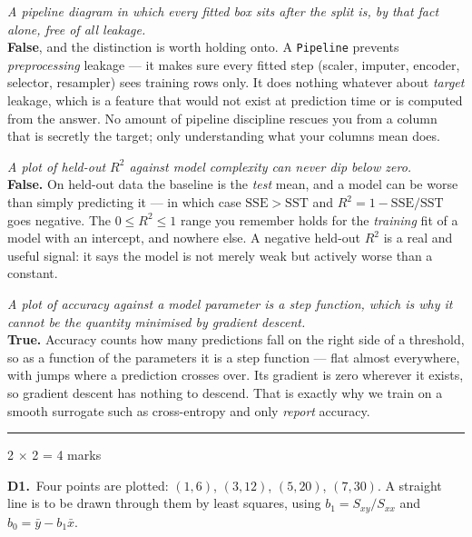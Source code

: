 \documentclass[10pt,a4paper]{article}
\newcommand{\parthead}[2]{\vspace{2pt}\noindent\rule{\linewidth}{0.4pt}\par\vspace{2pt}%
  \noindent{\bfseries Part #1}\hfill{\small #2}\par\vspace{1pt}}
\begin{document}
\begin{sC}

  \item \emph{A pipeline diagram in which every fitted box sits after the split is, by that fact alone, free of all leakage.}\\[2pt] \textbf{False}, and the distinction is worth holding onto. A \texttt{Pipeline} prevents \emph{preprocessing} leakage --- it makes sure every fitted step (scaler, imputer, encoder, selector, resampler) sees training rows only. It does nothing whatever about \emph{target} leakage, which is a feature that would not exist at prediction time or is computed from the answer. No amount of pipeline discipline rescues you from a column that is secretly the target; only understanding what your columns mean does.

  \item \emph{A plot of held-out $R^2$ against model complexity can never dip below zero.}\\[2pt] \textbf{False.} On held-out data the baseline is the \emph{test} mean, and a model can be worse than simply predicting it --- in which case $\mathrm{SSE} > \mathrm{SST}$ and $R^2 = 1 - \mathrm{SSE}/\mathrm{SST}$ goes negative. The $0 \le R^2 \le 1$ range you remember holds for the \emph{training} fit of a model with an intercept, and nowhere else. A negative held-out $R^2$ is a real and useful signal: it says the model is not merely weak but actively worse than a constant.

  \item \emph{A plot of accuracy against a model parameter is a step function, which is why it cannot be the quantity minimised by gradient descent.}\\[2pt] \textbf{True.} Accuracy counts how many predictions fall on the right side of a threshold, so as a function of the parameters it is a step function --- flat almost everywhere, with jumps where a prediction crosses over. Its gradient is zero wherever it exists, so gradient descent has nothing to descend. That is exactly why we train on a smooth surrogate such as cross-entropy and only \emph{report} accuracy.

\end{sC}

\newpage

\parthead{D --- Short answer}{2 $\times$ 2 = 4 marks}

\textbf{D1.}\ Four points are plotted: $(1,6)$, $(3,12)$, $(5,20)$, $(7,30)$. A straight line is to be drawn through them by least squares, using $b_1 = S_{xy}/S_{xx}$ and $b_0 = \bar y - b_1\bar x$.
\end{document}
